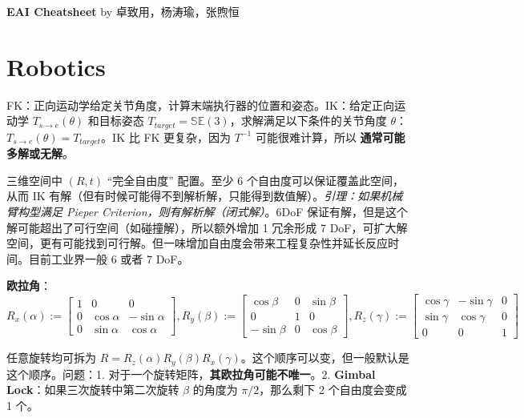 \documentclass[
  8pt]{extarticle}
\author{}
\date{}
\begin{document}
\begin{multicols*}{4}
    \footnotesize

    \begin{center}
        \textbf{EAI Cheatsheet} by 卓致用，杨涛瑜，张煦恒
    \end{center}
    \vspace{-1.75em} %

\hypertarget{robotics}{%
\section{Robotics}\label{robotics}}

FK：正向运动学给定关节角度，计算末端执行器的位置和姿态。IK：给定正向运动学
\(T_{s \rightarrow e}(\theta)\) 和目标姿态
\(T_{target} = \mathbb{SE}(3)\)，求解满足以下条件的关节角度 \(\theta\)：
\(T_{s \rightarrow e}(\theta) = T_{target}\)。IK 比 FK 更复杂，因为
\(T^{-1}\) 可能很难计算，所以 \textbf{通常可能多解或无解}。

三维空间中 \((R,t)\) ``完全自由度'' 配置。至少 6
个自由度可以保证覆盖此空间，从而 IK
有解（但有时候可能得不到解析解，只能得到数值解）。\emph{引理：如果机械臂构型满足
Pieper Criterion，则有解析解（闭式解）}。6DoF
保证有解，但是这个解可能超出了可行空间（如碰撞解），所以额外增加 1
冗余形成 7
DoF，可扩大解空间，更有可能找到可行解。但一味增加自由度会带来工程复杂性并延长反应时间。目前工业界一般
6 或者 7 DoF。

\textbf{欧拉角}：\(R_{x}(\alpha):=\begin{bmatrix}1&0&0\\0&\cos\alpha&-\sin\alpha\\0&\sin\alpha&\cos\alpha\end{bmatrix}, R_{y}(\beta):=\begin{bmatrix}\cos\beta&0&\sin\beta\\0&1&0\\-\sin\beta&0&\cos\beta\end{bmatrix}, R_{z}(\gamma):=\begin{bmatrix}\cos\gamma&-\sin\gamma&0\\\sin\gamma&\cos\gamma&0\\0&0&1\end{bmatrix}\)

任意旋转均可拆为
\(R=R_{z}(\alpha)R_{y}(\beta)R_{x}(\gamma)\)。这个顺序可以变，但一般默认是这个顺序。问题：1.
对于一个旋转矩阵，\textbf{其欧拉角可能不唯一}。2. \textbf{Gimbal
Lock}：如果三次旋转中第二次旋转 \(\beta\) 的角度为 \(\pi/2\)，那么剩下 2
个自由度会变成 1 个。


\end{multicols*}
\end{document}
